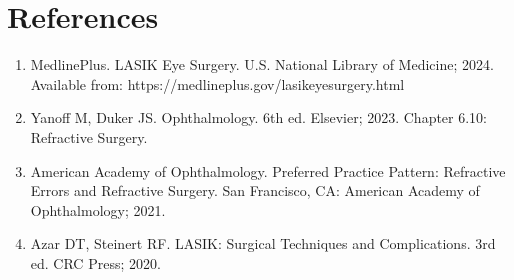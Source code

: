 \section*{References}
\begin{enumerate}
  \item MedlinePlus. LASIK Eye Surgery. U.S. National Library of Medicine; 2024. Available from: https://medlineplus.gov/lasikeyesurgery.html
  
  \item Yanoff M, Duker JS. Ophthalmology. 6th ed. Elsevier; 2023. Chapter 6.10: Refractive Surgery.
  
  \item American Academy of Ophthalmology. Preferred Practice Pattern: Refractive Errors and Refractive Surgery. San Francisco, CA: American Academy of Ophthalmology; 2021.
  
  \item Azar DT, Steinert RF. LASIK: Surgical Techniques and Complications. 3rd ed. CRC Press; 2020.
\end{enumerate}

\clearpage

